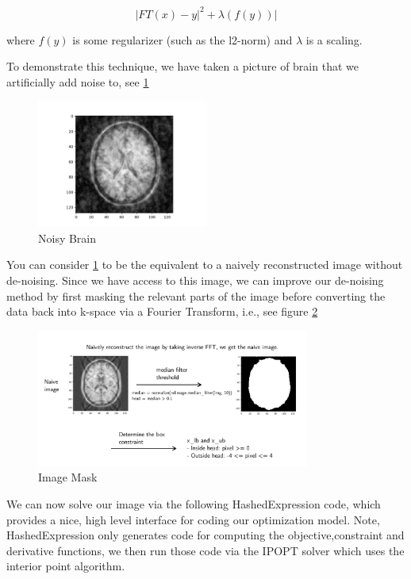 \documentclass[11pt]{article}
\begin{document}
\begin{equation}
| FT(x) - y | ^2 + \lambda(f(y)) |
\end{equation}

where \(f(y)\) is some regularizer (such as the l2-norm) and \(\lambda\) is a scaling.

To demonstrate this technique, we have taken a picture of brain that we
artificially add noise to, see \ref{fig:BrainBefore}

\begin{figure}[!htpb]
\centering
\includegraphics[width=0.5\textwidth]{figs/brain_before.png}
\caption{\label{fig:BrainBefore}Noisy Brain}
\end{figure}

You can consider \ref{fig:BrainBefore} to be the equivalent to a naively
reconstructed image without de-noising. Since we have access to this image, we
can improve our de-noising method by first masking the relevant parts of the
image before converting the data back into k-space via a Fourier Transform,
i.e., see figure \ref{fig:ImageMask}

\begin{figure}[!htpb]
\centering
\includegraphics[width=0.8\textwidth]{figs/MRIBrain2.pdf}
\caption{\label{fig:ImageMask}Image Mask}
\end{figure}

We can now solve our image via the following HashedExpression code, which
provides a nice, high level interface for coding our optimization model. Note,
HashedExpression only generates code for computing the objective,constraint
and derivative functions, we then run those code via the IPOPT solver which
uses the interior point algorithm.
\end{document}
